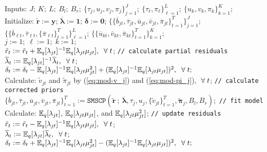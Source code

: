 \begin{algorithm}[!h]
\label{alg:1}
\small
\SetAlgoLined
  Inputs: $J;\:K;\:L;\:B_l;\:B_r;\:\{\tau_j,u_j,v_j,\pi_j\}_{j=1}^J;\:\{\tau_\ell,\pi_\ell\}_{\ell=1}^L;\:\{u_k,v_k,\pi_k\}_{k=1}^K$; \\
  Initialize: $\tilde{\mathbf{r}} := \mathbf{y}$; $\overline{\pmb{\lambda}}:= \mathbf{1}$; $\pmb{\delta}:=\mathbf{0}$; $\{\{\overline{b}_{jt}, \overline{\tau}_{jt}, \overline{u}_{jt}, \overline{v}_{jt}, \overline{\pi}_{jt}\}_{t=1}^T\}_{j=1}^J$; $\{\{\overline{b}_{\ell t}, \overline{\tau}_{\ell t}, \{\overline{\pi}_{\ell t}\}_{t=1}^T\}_{\ell=1}^L$; $\{\{\overline{u}_{kt}, \overline{v}_{kt}, \overline{\pi}_{kt}\}_{t=1}^T\}_{k=1}^K$;\\
  
   {
    $j:=1;\;\ell:=1;\;k:=1;$ \\
     {
      $\tilde{r}_t := \tilde{r}_t + \mathbb{E}_q[\lambda_{jt}]^{-1}\mathbb{E}_q[\lambda_{jt} \mu_{jt}],\; \;\forall\; t$; \texttt{// calculate partial residuals} \\
      $\overline{\lambda}_t := \mathbb{E}_q[\lambda_{jt}]^{-1}\overline{\lambda}_t, \; \;\forall\; t$; \\
      $\delta_t := \delta_t - \mathbb{E}_q[\lambda_{jt}]^{-1}\mathbb{E}_q[\lambda_{jt} \mu^2_{jt}] + (\mathbb{E}_q[\lambda_{jt}]^{-1}\mathbb{E}_q[\lambda_{jt} \mu_{jt}])^2,\; \;\forall\; t;$ \\
      Calculate: $\tilde{v}_{jt}$ and $\tilde{\pi}_{jt}$ by (\ref{eq:mod-v_j}) and (\ref{eq:mod-pi_j}), $\;\forall\; t$; \texttt{// calculate corrected priors} \\
      $\{\overline{b}_{jt}, \overline{\tau}_{jt}, \overline{u}_{jt}, \overline{v}_{jt}, \overline{\pi}_{jt}\}_{t=1}^T := \texttt{SMSCP}(\tilde{\mathbf{r}} \:;\:\overline{\pmb{\lambda}}, \tau_j, u_j, \{\tilde{v}_{jt}\}_{t=1}^T, \tilde{\pmb{\pi}}_j, B_l,B_r);$ \texttt{// fit model}\\
      Calculate: $\mathbb{E}_q[\lambda_{jt}]$, $\mathbb{E}_q[\lambda_{jt} \mu_{jt}]$, and $\mathbb{E}_q[\lambda_{jt} \mu^2_{jt}]$; \texttt{// update residuals}\\
      $\tilde{r}_t := \tilde{r}_t - \mathbb{E}_q[\lambda_{jt}]^{-1}\mathbb{E}_q[\lambda_{jt} \mu_{jt}],\; \;\forall\; t$; \\
      $\overline{\lambda}_t := \mathbb{E}_q[\lambda_{jt}]\overline{\lambda}_t, \; \;\forall\; t$; \\
      $\delta_t := \delta_t + \mathbb{E}_q[\lambda_{jt}]^{-1}\mathbb{E}_q[\lambda_{jt} \mu^2_{jt}] - (\mathbb{E}_q[\lambda_{jt}]^{-1}\mathbb{E}_q[\lambda_{jt} \mu_{jt}])^2,\; \;\forall\; t;$ \\
}}
\end{algorithm}
